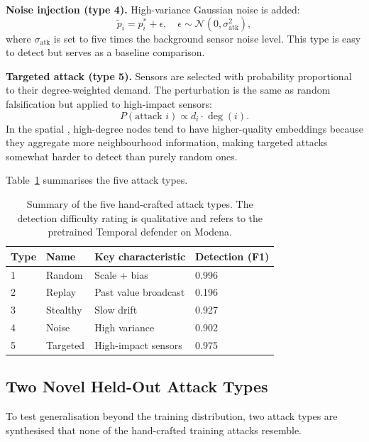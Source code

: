 \textbf{Noise injection (type 4).} High-variance Gaussian noise is
added:
\begin{equation}
  \tilde{p}_i = p_i^* + \epsilon, \quad
  \epsilon \sim \mathcal{N}(0, \sigma_\text{atk}^2),
\end{equation}
where $\sigma_\text{atk}$ is set to five times the background sensor
noise level. This type is easy to detect but serves as a baseline
comparison.

\textbf{Targeted attack (type 5).} Sensors are selected with
probability proportional to their degree-weighted demand. The
perturbation is the same as random falsification but applied to
high-impact sensors:
\begin{equation}
  P(\text{attack } i) \propto d_i \cdot \deg(i).
\end{equation}
In the spatial \gnn{}, high-degree nodes tend to have
higher-quality embeddings because they aggregate more neighbourhood
information, making targeted attacks somewhat harder to detect than
purely random ones.

Table~\ref{tab:attacks} summarises the five attack types.

\begin{table}[htbp]
  \centering
  \caption{Summary of the five hand-crafted attack types. The
  detection difficulty rating is qualitative and refers to the
  pretrained Temporal \moe{} defender on Modena.}
  \label{tab:attacks}
  \begin{tabular}{llll}
    \toprule
    Type & Name & Key characteristic & Detection (F1) \\
    \midrule
    1 & Random     & Scale + bias         & 0.996 \\
    2 & Replay     & Past value broadcast & 0.196 \\
    3 & Stealthy   & Slow drift           & 0.927 \\
    4 & Noise      & High variance        & 0.902 \\
    5 & Targeted   & High-impact sensors  & 0.975 \\
    \bottomrule
  \end{tabular}
\end{table}

\subsection{Two Novel Held-Out Attack Types}
\label{sec:heldout_attacks}

To test generalisation beyond the training distribution, two attack
types are synthesised that none of the hand-crafted training attacks
resemble.

